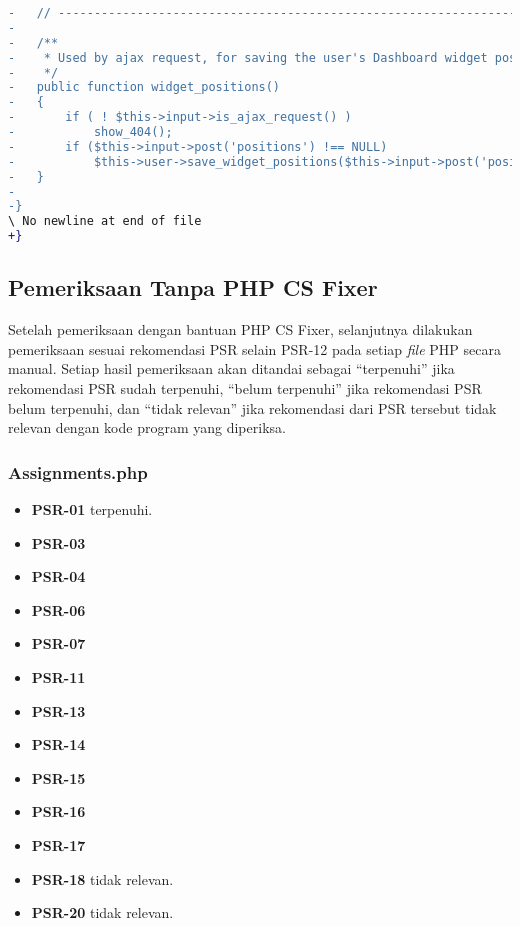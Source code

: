 \begin{lstlisting}[language=diff, basicstyle=\ttfamily, frame=single,
	columns=fullflexible, keepspaces=true, breaklines=true, label=ck:31, caption=Contoh penggunaan PHP CS Fixer pada \textit{Dashboard.php}]
-	// ------------------------------------------------------------------------
-
-	/**
-	 * Used by ajax request, for saving the user's Dashboard widget positions
-	 */
-	public function widget_positions()
-	{
-		if ( ! $this->input->is_ajax_request() )
-			show_404();
-		if ($this->input->post('positions') !== NULL)
-			$this->user->save_widget_positions($this->input->post('positions'));
-	}
-
-}
\ No newline at end of file
+}

\end{lstlisting}

\subsection{Pemeriksaan Tanpa PHP CS Fixer}
\label{periksa_manual}
Setelah pemeriksaan dengan bantuan PHP CS Fixer, selanjutnya dilakukan pemeriksaan sesuai rekomendasi PSR selain PSR-12 pada setiap \textit{file} PHP secara manual. Setiap hasil pemeriksaan akan ditandai sebagai ``terpenuhi'' jika rekomendasi PSR sudah terpenuhi, ``belum terpenuhi'' jika rekomendasi PSR belum terpenuhi, dan ``tidak relevan'' jika rekomendasi dari PSR tersebut tidak relevan dengan kode program yang diperiksa.

\subsubsection{Assignments.php} 
\begin{itemize}
	\item \textbf{PSR-01} terpenuhi.
	\item \textbf{PSR-03} 
	\item \textbf{PSR-04}
	\item \textbf{PSR-06}
	\item \textbf{PSR-07}
	\item \textbf{PSR-11}
	\item \textbf{PSR-13}
	\item \textbf{PSR-14}
	\item \textbf{PSR-15}
	\item \textbf{PSR-16}
	\item \textbf{PSR-17} 
	\item \textbf{PSR-18} tidak relevan.
	\item \textbf{PSR-20} tidak relevan.
\end{itemize}

